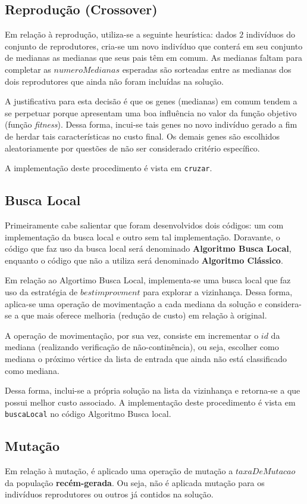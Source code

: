 	\subsection{Reprodução (Crossover)}
	Em relação à reprodução, utiliza-se a seguinte heurística: dados $2$ indivíduos do conjunto de reprodutores, cria-se um novo indivíduo que conterá em seu conjunto de medianas as medianas que seus pais têm em comum. As medianas faltam para completar as $numeroMedianas$ esperadas são sorteadas entre as medianas dos dois reprodutores que ainda não foram incluídas na solução.

	A justificativa para esta decisão é que os genes (medianas) em comum tendem a se perpetuar porque apresentam uma boa influência no valor da função objetivo (função \textit{fitness}). Dessa forma, incui-se tais genes no novo indivíduo gerado a fim de herdar tais características no custo final. Os demais genes são escolhidos aleatoriamente por questões de não ser considerado critério específico.

	A implementação deste procedimento é vista em \verb|cruzar|.

	\subsection{Busca Local} \label{bl}
	Primeiramente cabe salientar que foram desenvolvidos dois códigos: um com implementação da busca local e outro sem tal implementação. Doravante, o código que faz uso da busca local será denominado \textbf{Algoritmo Busca Local}, enquanto o código que não a utiliza será denominado \textbf{Algoritmo Clássico}.

	Em relação ao Algortimo Busca Local, implementa-se uma busca local que faz uso da estratégia de $best improvment$ para explorar a vizinhança. Dessa forma, aplica-se uma operação de movimentação a cada mediana da solução e considera-se a que mais oferece melhoria (redução de custo) em relação à original.

	A operação de movimentação, por sua vez, consiste em incrementar o $id$ da mediana (realizando verificação de não-continência), ou seja, escolher como mediana o próximo vértice da lista de entrada que ainda não está classificado como mediana.

	Dessa forma, inclui-se a própria solução na lista da vizinhança e retorna-se a que possui melhor custo associado. A implementação deste procedimento é vista em \verb|buscaLocal| no código Algoritmo Busca local.

	\subsection{Mutação}
	Em relação à mutação, é aplicado uma operação de mutação a $taxaDeMutacao$ da população \textbf{recém-gerada}. Ou seja, não é aplicada mutação para os indivíduos reprodutores ou outros já contidos na solução.

